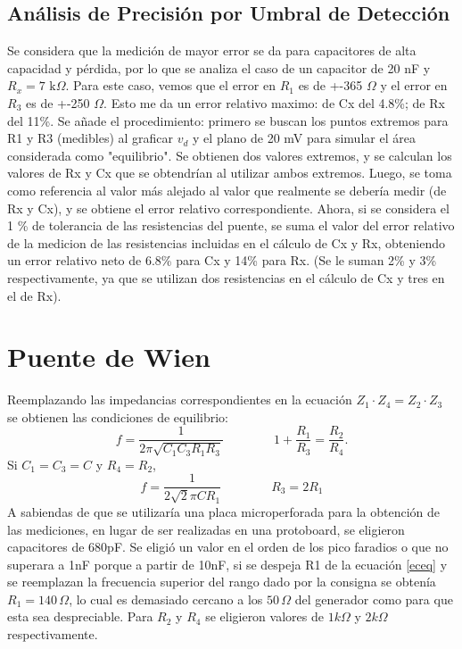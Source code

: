 \documentclass{article}
\begin{document}
\subsection{Análisis de Precisión por Umbral de Detección}
Se considera que la medición de mayor error se da para capacitores de alta capacidad y pérdida, por lo que se analiza el caso de un capacitor de 20 nF
 y $R_x=7\text{ k}\Omega$. Para este caso, vemos que el error en $R_1$ es de +-365 $\Omega$ y el error en $R_3$ es de +-250 $\Omega$. Esto me da un error
  relativo maximo: de Cx del 4.8\%; de Rx del 11\%. Se añade el procedimiento: primero se buscan los puntos 
  extremos para R1 y R3 (medibles) al graficar $v_d$ y el plano de 20 mV para simular el área considerada como "equilibrio". Se obtienen dos valores extremos,
   y se calculan los valores de Rx y Cx que se obtendrían al utilizar ambos extremos. Luego, se toma como referencia al valor más alejado al valor que
    realmente se debería medir (de Rx y Cx), y se obtiene el error relativo correspondiente.
Ahora, si se considera el 1 \% de tolerancia de las resistencias del puente, se suma el valor del error relativo de la medicion de las resistencias 
incluidas en el cálculo de Cx y Rx, obteniendo un error relativo neto de 6.8\% para Cx y 14\% para Rx. (Se le suman 2\% y 3\% respectivamente, ya que se utilizan dos resistencias en el cálculo de Cx y tres en el de Rx).



\section{Puente de Wien}

Reemplazando las impedancias correspondientes en la ecuación $Z_1 \cdot Z_4 = Z_2 \cdot Z_3$ se obtienen las condiciones de equilibrio:
\begin{equation}
        f = \frac{1}{2\pi\sqrt{C_1C_3R_1R_3}} \qquad \qquad 1+\frac{R_1}{R_3} = \frac{R_2}{R_4}.
\end{equation}
Si $C_1=C_3=C$ y $R_4=R_2$,
\begin{equation}
        f = \frac{1}{2\sqrt{2}\pi C R_1} \qquad \qquad R_3=2R_1
\end{equation} \label{eceq}
A sabiendas de que se utilizaría una placa microperforada para la obtención de las mediciones, en lugar de ser realizadas en una protoboard, se eligieron capacitores de 680pF. Se eligió un valor en el orden de los pico faradios o que no superara a 1nF porque a partir de 10nF, si se despeja R1 de la ecuación \ref{eceq} y se reemplazan la frecuencia superior del rango dado por la consigna se obtenía $R_1=140\,\Omega$, lo cual es demasiado cercano a los $50\,\Omega$ del generador como para que esta sea despreciable.
Para $R_2$ y $R_4$ se eligieron valores de $1k\Omega$ y $2k\Omega$ respectivamente.
\end{document}
